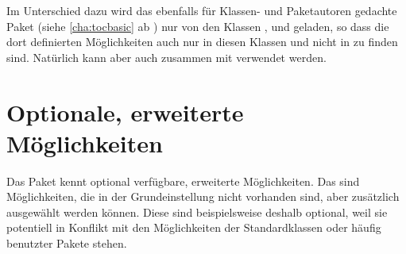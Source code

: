 \iftrue %
Im Unterschied dazu wird das ebenfalls für Klassen- und Paketautoren gedachte
Paket \hyperref[cha:tocbasic]{} (siehe
\autoref{cha:tocbasic} ab ) nur von den Klassen
,  und  geladen, so dass die
dort definierten Möglichkeiten auch nur in diesen Klassen und nicht in
 zu finden sind. Natürlich kann
\hyperref[cha:tocbasic]{} aber auch zusammen mit
 verwendet werden.%
\fi




\section{Optionale, erweiterte Möglichkeiten}

Das Paket  kennt optional verfügbare, erweiterte
Möglichkeiten. Das sind Möglichkeiten, die in der Grundeinstellung nicht
vorhanden sind, aber zusätzlich ausgewählt werden können. Diese
sind beispielsweise deshalb optional, weil sie potentiell in Konflikt mit den
Möglichkeiten der Standardklassen oder häufig benutzter Pakete stehen.


